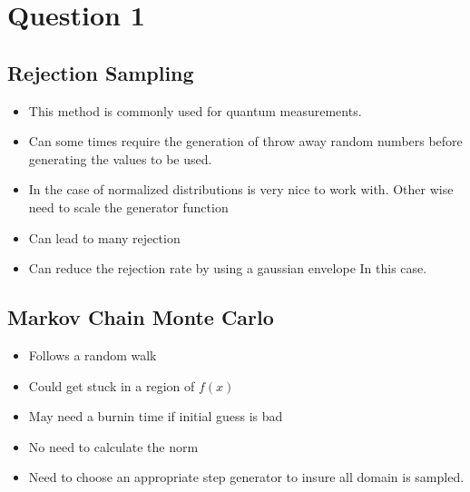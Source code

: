 \documentclass{article}
\begin{document}
\section{Question 1}

\subsection{Rejection Sampling}

\begin{itemize}
\itemsep-0.3cm 
\item This method is commonly used for quantum measurements.\citep{Rivas2011} \\
\item Can some times require the generation of throw away random numbers before generating the values to be used. \\
\item In the case of normalized distributions is very nice to work with. Other wise need to scale the generator function \citep{JakeRS}\\
\item Can lead to many rejection \\
\item Can reduce the rejection rate by using a gaussian envelope In this case. \citep{RelSRS}\\
\end{itemize}




\subsection{Markov Chain Monte Carlo}

\begin{itemize}
\itemsep-0.3cm 
\item Follows a random walk \\
\item Could get stuck in a region of $f(x)$\citep{robert2016metropolishastingsalgorithm} \\
\item May need a burnin time if initial guess is bad\citep{DMHA}\\
\item No need to calculate the norm\\ 
\item Need to choose an appropriate step generator to insure all domain is sampled.\\
\end{itemize}
\end{document}
